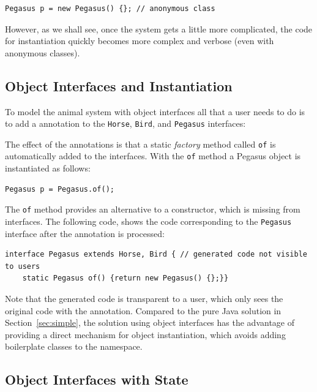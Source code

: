 \begin{lstlisting}
Pegasus p = new Pegasus() {}; // anonymous class
\end{lstlisting}

\noindent However, as we shall see, once the system gets a little more
complicated, the code for instantiation quickly becomes more
complex and verbose (even with anonymous classes).

\subsection{Object Interfaces and Instantiation}

To model the animal system with object interfaces all that a user
needs to do is to add a \mixinAnn{} annotation to the \texttt{Horse},
\texttt{Bird}, and \texttt{Pegasus} interfaces:


\noindent The effect of the annotations is that a static \emph{factory} method called
\texttt{of} is automatically added to the interfaces. With the
\texttt{of} method a Pegasus object is instantiated as follows:

\begin{lstlisting}
Pegasus p = Pegasus.of();
\end{lstlisting}

\noindent The \texttt{of} method provides an alternative to a
constructor, which is missing from interfaces. The following code,
shows the code corresponding to the \texttt{Pegasus} interface
after the \mixinAnn{} annotation is processed:

\begin{lstlisting}
interface Pegasus extends Horse, Bird { // generated code not visible to users
	static Pegasus of() {return new Pegasus() {};}}
\end{lstlisting}

\noindent Note that the generated code is transparent to a user, which
only sees the original code with the \mixin annotation. Compared to the pure
Java solution in Section~\ref{sec:simple}, the solution using object interfaces
has the advantage of providing a direct mechanism for object
instantiation, which avoids adding boilerplate classes to the
namespace.

\subsection{Object Interfaces with State}

